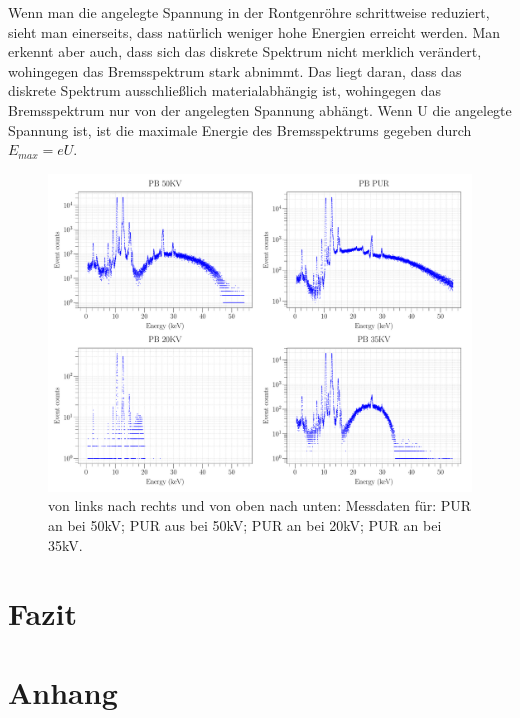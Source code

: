 \documentclass[a4paper,14pt]{article}
\begin{document}
Wenn man die angelegte Spannung in der Rontgenröhre schrittweise reduziert, sieht man einerseits, dass natürlich weniger hohe Energien erreicht werden. Man erkennt aber auch, dass sich das diskrete Spektrum nicht merklich verändert, wohingegen das Bremsspektrum stark abnimmt. Das liegt daran, dass das diskrete Spektrum ausschließlich materialabhängig ist, wohingegen das Bremsspektrum nur von der angelegten Spannung abhängt. Wenn U die angelegte Spannung ist, ist die maximale Energie des Bremsspektrums gegeben durch $E_{max} = eU$.

\begin{figure}[H]
\centering
\includegraphics[scale=0.25]{../Figures/XRay-comparison.pdf}
\caption{von links nach rechts und von oben nach unten: Messdaten für: PUR an bei 50kV; PUR aus bei 50kV; PUR an bei 20kV; PUR an bei 35kV.}
\label{XRay-comparison}
\end{figure}


\section{Fazit}


\section{Anhang}


	
\end{document}
